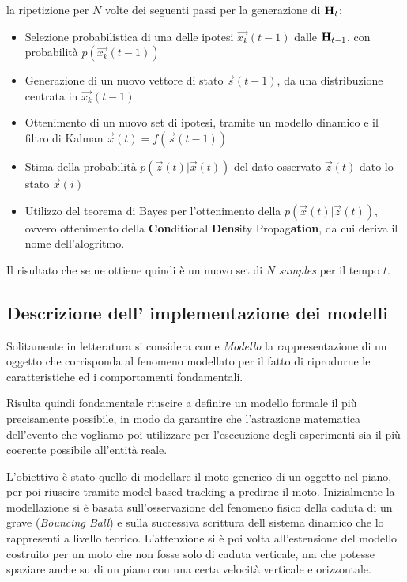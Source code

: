la ripetizione per $N$ volte dei seguenti passi per la generazione di $\mbox{{\bfseries H}}_t$:
\begin{itemize}
\item Selezione probabilistica di una delle ipotesi $\overrightarrow{x_k}(t-1)$ dalle $\mbox{{\bfseries H}}_{t-1}$, con probabilità $p(\overrightarrow{x_k}(t-1))$
\item Generazione di un nuovo vettore di stato $\overrightarrow{s}(t-1)$, da una distribuzione centrata in   $\overrightarrow{x_k}(t-1)$
\item Ottenimento di un nuovo set di ipotesi, tramite un modello dinamico e il filtro di Kalman $\overrightarrow{x}(t)=f(\overrightarrow{s}(t-1))$
\item Stima della probabilità $p(\overrightarrow{z}(t)|\overrightarrow{x}(t))$ del dato osservato $\overrightarrow{z}(t)$ dato lo stato $\overrightarrow{x}(i)$
\item Utilizzo del teorema di Bayes per l'ottenimento della $p(\overrightarrow{x}(t)|\overrightarrow{z}(t))$, ovvero ottenimento della \textbf{Con}ditional \textbf{Dens}ity Propag\textbf{ation}, da cui deriva il nome dell'alogritmo.
\end{itemize}

Il risultato che se ne ottiene quindi è un nuovo set di $N$ \textit{samples} per il tempo $t$.
\subsection{Descrizione dell' implementazione dei modelli} \label{sec:modelli}
Solitamente in letteratura si considera come \textit{Modello} la rappresentazione di un oggetto che corrisponda al fenomeno modellato per il fatto  di riprodurne le caratteristiche ed i comportamenti fondamentali. 

Risulta quindi fondamentale riuscire a definire un modello formale il più precisamente possibile, in modo da garantire che l'astrazione matematica dell'evento che vogliamo poi utilizzare per l'esecuzione degli esperimenti sia il più coerente possibile all'entità reale. 

L'obiettivo è stato quello di modellare il moto generico di un oggetto nel piano, per poi riuscire tramite model based tracking a predirne il moto. Inizialmente la modellazione si è basata sull'osservazione del fenomeno fisico della caduta di un grave (\textit{Bouncing Ball}) e sulla successiva scrittura dell sistema dinamico che lo rappresenti a livello teorico. L'attenzione si è poi volta all'estensione del modello costruito per un moto che non fosse solo di caduta verticale, ma che potesse spaziare anche su di un piano con una certa velocità verticale e orizzontale. 

